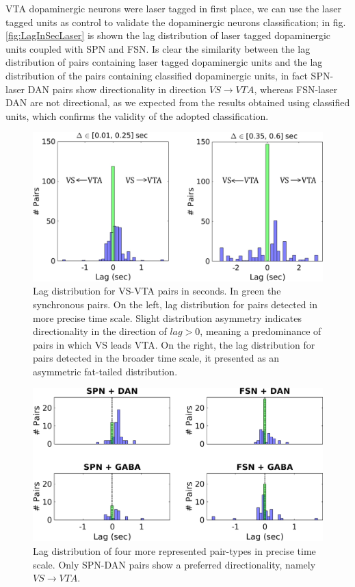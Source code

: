 VTA dopaminergic neurons were laser tagged in first place, we can use the laser tagged units as control to validate the dopaminergic neurons classification; in fig.\ref{fig:LagInSecLaser} is shown the lag distribution of laser tagged dopaminergic units coupled with SPN and FSN. Is clear the similarity between the lag distribution of pairs containing laser tagged dopaminergic units and the lag distribution of the pairs containing classified dopaminergic units, in fact SPN-laser DAN pairs show directionality in direction $VS\rightarrow VTA$, whereas FSN-laser DAN are not directional, as we expected from the results obtained using classified units, which confirms the validity of the adopted classification.\\
\begin{figure}[H]
\centering
\includegraphics[scale=0.6]{figures/LagGeneral1.pdf}
\caption{Lag distribution for VS-VTA pairs in seconds. In green the synchronous pairs. On the left, lag distribution for pairs detected in more precise time scale. Slight distribution asymmetry indicates directionality in the direction of $lag > 0$, meaning a predominance of pairs in which VS leads VTA. On the right, the lag distribution for pairs detected in the broader time scale, it presented as an asymmetric fat-tailed distribution.}
\label{fig:LagInSecAll}
\end{figure}
\begin{figure}[H]
\centering
\includegraphics[scale=0.5]{figures/LagSec4Typo3VS.png}
\caption{Lag distribution of four more represented pair-types in precise time scale. Only SPN-DAN pairs show a preferred directionality, namely $VS\rightarrow VTA$.}
\label{fig:LagInSec4typo}
\end{figure}
